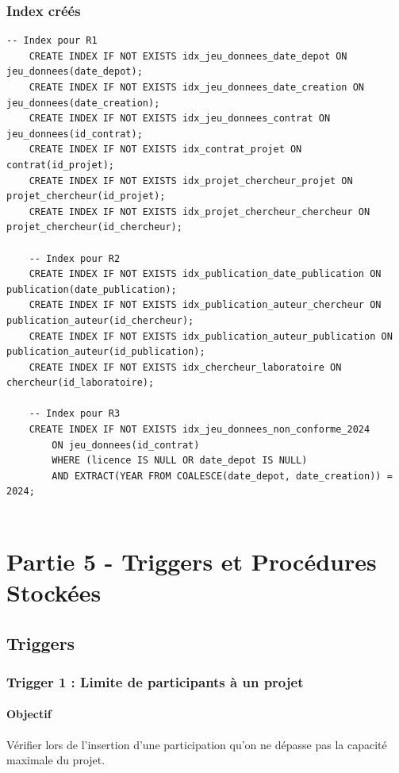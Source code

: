 \documentclass[12pt,a4paper]{article}
\begin{document}
\subsubsection{Index créés}
\begin{lstlisting}[style=sqlstyle, caption={Index créés pour les requêtes R1, R2 et R3}]
    -- Index pour R1
    CREATE INDEX IF NOT EXISTS idx_jeu_donnees_date_depot ON jeu_donnees(date_depot);
    CREATE INDEX IF NOT EXISTS idx_jeu_donnees_date_creation ON jeu_donnees(date_creation);
    CREATE INDEX IF NOT EXISTS idx_jeu_donnees_contrat ON jeu_donnees(id_contrat);
    CREATE INDEX IF NOT EXISTS idx_contrat_projet ON contrat(id_projet);
    CREATE INDEX IF NOT EXISTS idx_projet_chercheur_projet ON projet_chercheur(id_projet);
    CREATE INDEX IF NOT EXISTS idx_projet_chercheur_chercheur ON projet_chercheur(id_chercheur);

    -- Index pour R2
    CREATE INDEX IF NOT EXISTS idx_publication_date_publication ON publication(date_publication);
    CREATE INDEX IF NOT EXISTS idx_publication_auteur_chercheur ON publication_auteur(id_chercheur);
    CREATE INDEX IF NOT EXISTS idx_publication_auteur_publication ON publication_auteur(id_publication);
    CREATE INDEX IF NOT EXISTS idx_chercheur_laboratoire ON chercheur(id_laboratoire);

    -- Index pour R3
    CREATE INDEX IF NOT EXISTS idx_jeu_donnees_non_conforme_2024 
        ON jeu_donnees(id_contrat) 
        WHERE (licence IS NULL OR date_depot IS NULL)
        AND EXTRACT(YEAR FROM COALESCE(date_depot, date_creation)) = 2024;
    
\end{lstlisting}

\newpage

\section{Partie 5 - Triggers et Procédures Stockées}

\subsection{Triggers}

\subsubsection{Trigger 1 : Limite de participants à un projet}

\paragraph{Objectif}
Vérifier lors de l'insertion d'une participation qu'on ne dépasse pas la capacité maximale du projet.
\end{document}
